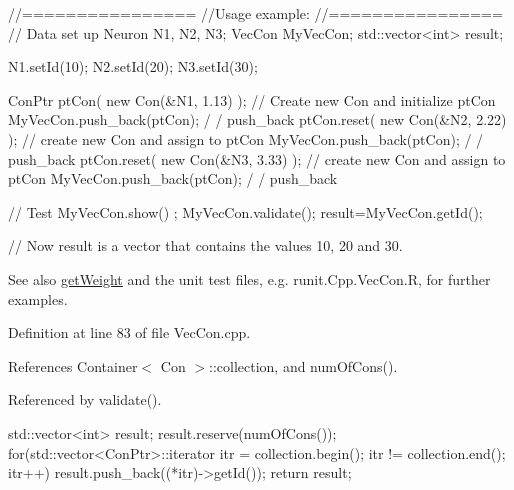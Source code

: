 \begin{DoxyCode}
  //================
  //Usage example:
  //================
        // Data set up
                        Neuron N1, N2, N3;
                        VecCon MyVecCon;
                        std::vector<int> result;

                        N1.setId(10);
                        N2.setId(20);
                        N3.setId(30);

                        ConPtr ptCon( new Con(&N1, 1.13) );       // Create
       new Con and initialize ptCon
                        MyVecCon.push_back(ptCon);                              /
      / push_back
                        ptCon.reset(  new Con(&N2, 2.22) );             // create
       new Con and assign to ptCon
                        MyVecCon.push_back(ptCon);                              /
      / push_back
                        ptCon.reset(  new Con(&N3, 3.33) );             // create
       new Con and assign to ptCon
                        MyVecCon.push_back(ptCon);                              /
      / push_back

        // Test
                        MyVecCon.show() ;
                        MyVecCon.validate();
                        result=MyVecCon.getId();

        // Now result is a vector that contains the values 10, 20 and 30.
\end{DoxyCode}


\begin{DoxySeeAlso}{See also}
\hyperlink{classvec_con_a76f10669494f2247d036ae6a1f296873}{getWeight} and the unit test files, e.g. runit.Cpp.VecCon.R, for further examples. 
\end{DoxySeeAlso}


Definition at line 83 of file VecCon.cpp.



References Container$<$ Con $>$::collection, and numOfCons().



Referenced by validate().


\begin{DoxyCode}
                                  {
        std::vector<int> result;
        result.reserve(numOfCons());
        for(std::vector<ConPtr>::iterator itr = collection.begin();   itr != 
      collection.end();   itr++)   { result.push_back((*itr)->getId()); }
        return result;
}
\end{DoxyCode}


